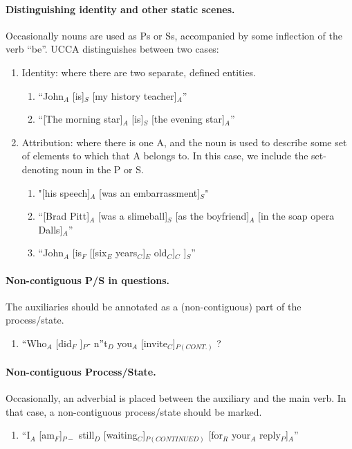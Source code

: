 \documentclass[11pt]{article}
\newcommand{\be}{\begin{enumerate}}
\newcommand{\ee}{\end{enumerate}}
\begin{document}
\paragraph{
Distinguishing identity and other static scenes.}
Occasionally nouns are used as Ps or Ss, accompanied by some inflection of the verb ``be''. UCCA distinguishes between two cases:
\be \item
Identity: where there are two separate, defined entities.
\be \item
``John$_A$ [is]$_S$ [my history teacher]$_A$''
\item
``[The morning star]$_A$ [is]$_S$ [the evening star]$_A$''
\ee

\item
Attribution: where there is one A, and the noun is used to describe some set of elements to which that A belongs to. In this case, we include the set-denoting noun in the P or S.
\be \item
"[his speech]$_A$ [was an embarrassment]$_S$"
\item
``[Brad Pitt]$_A$ [was a slimeball]$_S$ [as the boyfriend]$_A$ [in the soap opera Dalls]$_A$''
\item
``John$_A$ [is$_F$ [[six$_E$ years$_C$]$_E$ old$_C$]$_C$ ]$_S$''
\ee
\ee

\paragraph{
Non-contiguous P/S in questions.} The auxiliaries should be annotated as a (non-contiguous) part of the process/state.
\be \item
``Who$_A$ [did$_F$ ]$_P$- n''t$_D$ you$_A$ [invite$_C$]$_{P(CONT.)}$ ?
\ee


\paragraph{
Non-contiguous Process/State.} Occasionally, an adverbial is placed between the auxiliary and the main verb. In that case, a non-contiguous process/state should be marked.
\be \item
``I$_A$ [am$_F$]$_{P-}$ still$_D$ [waiting$_C$]$_{P(CONTINUED)}$ [for$_R$ your$_A$ reply$_P$]$_A$''
\ee
\end{document}
